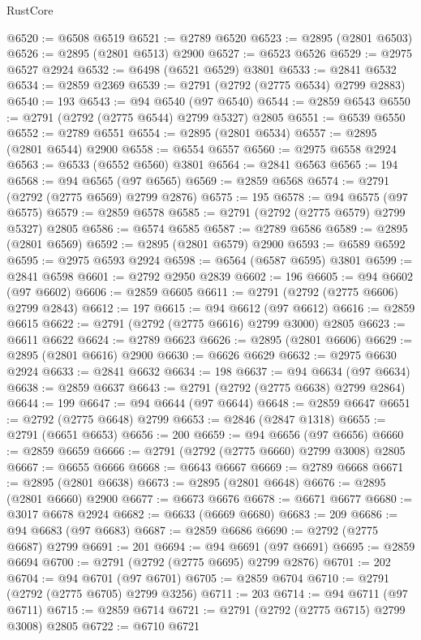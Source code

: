 \begin{lexlean}{RustCore}
\begin{coremodule}
@6520 := @6508 @6519
@6521 := @2789 @6520
@6523 := @2895 (@2801 @6503)
@6526 := @2895 (@2801 @6513) @2900
@6527 := @6523 @6526
@6529 := @2975 @6527 @2924
@6532 := @6498 (@6521 @6529) @3801
@6533 := @2841 @6532
@6534 := @2859 @2369
@6539 := @2791 (@2792 (@2775 @6534) @2799 @2883)
@6540 := 193
@6543 := @94 @6540 (@97 @6540)
@6544 := @2859 @6543
@6550 := @2791 (@2792 (@2775 @6544) @2799 @5327) @2805
@6551 := @6539 @6550
@6552 := @2789 @6551
@6554 := @2895 (@2801 @6534)
@6557 := @2895 (@2801 @6544) @2900
@6558 := @6554 @6557
@6560 := @2975 @6558 @2924
@6563 := @6533 (@6552 @6560) @3801
@6564 := @2841 @6563
@6565 := 194
@6568 := @94 @6565 (@97 @6565)
@6569 := @2859 @6568
@6574 := @2791 (@2792 (@2775 @6569) @2799 @2876)
@6575 := 195
@6578 := @94 @6575 (@97 @6575)
@6579 := @2859 @6578
@6585 := @2791 (@2792 (@2775 @6579) @2799 @5327) @2805
@6586 := @6574 @6585
@6587 := @2789 @6586
@6589 := @2895 (@2801 @6569)
@6592 := @2895 (@2801 @6579) @2900
@6593 := @6589 @6592
@6595 := @2975 @6593 @2924
@6598 := @6564 (@6587 @6595) @3801
@6599 := @2841 @6598
@6601 := @2792 @2950 @2839
@6602 := 196
@6605 := @94 @6602 (@97 @6602)
@6606 := @2859 @6605
@6611 := @2791 (@2792 (@2775 @6606) @2799 @2843)
@6612 := 197
@6615 := @94 @6612 (@97 @6612)
@6616 := @2859 @6615
@6622 := @2791 (@2792 (@2775 @6616) @2799 @3000) @2805
@6623 := @6611 @6622
@6624 := @2789 @6623
@6626 := @2895 (@2801 @6606)
@6629 := @2895 (@2801 @6616) @2900
@6630 := @6626 @6629
@6632 := @2975 @6630 @2924
@6633 := @2841 @6632
@6634 := 198
@6637 := @94 @6634 (@97 @6634)
@6638 := @2859 @6637
@6643 := @2791 (@2792 (@2775 @6638) @2799 @2864)
@6644 := 199
@6647 := @94 @6644 (@97 @6644)
@6648 := @2859 @6647
@6651 := @2792 (@2775 @6648) @2799
@6653 := @2846 (@2847 @1318)
@6655 := @2791 (@6651 @6653)
@6656 := 200
@6659 := @94 @6656 (@97 @6656)
@6660 := @2859 @6659
@6666 := @2791 (@2792 (@2775 @6660) @2799 @3008) @2805
@6667 := @6655 @6666
@6668 := @6643 @6667
@6669 := @2789 @6668
@6671 := @2895 (@2801 @6638)
@6673 := @2895 (@2801 @6648)
@6676 := @2895 (@2801 @6660) @2900
@6677 := @6673 @6676
@6678 := @6671 @6677
@6680 := @3017 @6678 @2924
@6682 := @6633 (@6669 @6680)
@6683 := 209
@6686 := @94 @6683 (@97 @6683)
@6687 := @2859 @6686
@6690 := @2792 (@2775 @6687) @2799
@6691 := 201
@6694 := @94 @6691 (@97 @6691)
@6695 := @2859 @6694
@6700 := @2791 (@2792 (@2775 @6695) @2799 @2876)
@6701 := 202
@6704 := @94 @6701 (@97 @6701)
@6705 := @2859 @6704
@6710 := @2791 (@2792 (@2775 @6705) @2799 @3256)
@6711 := 203
@6714 := @94 @6711 (@97 @6711)
@6715 := @2859 @6714
@6721 := @2791 (@2792 (@2775 @6715) @2799 @3008) @2805
@6722 := @6710 @6721

\end{coremodule}
\end{lexlean}
